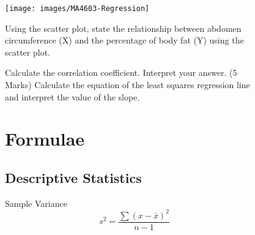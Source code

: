 %	
%	
%	
%	
%	
%	
%	
%	
%	
%	
%	
%
\newpage
\begin{figure}[h!]
\centering
\texttt{[image: images/MA4603-Regression]}



\begin{enumerate}[(i)]
	
  Using the scatter plot, state the relationship between abdomen circumference (X) and the percentage of body fat (Y) using the scatter plot.
	
	
	
	
	
  Calculate the correlation coefficient. Interpret your answer.
 (5 Marks) Calculate the equation of the least squares regression line and interpret the value of the slope.
\end{enumerate}
%










\newpage

\section*{Formulae}
\subsection*{Descriptive Statistics}
\begin{itemize}
 Sample Variance
	\begin{equation*}
	s^2 = \frac{\sum (x-\bar{x})^2}{n-1}
	\end{equation*}
\end{itemize}



\end{figure}
